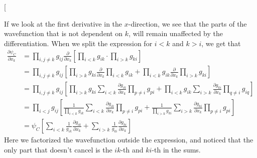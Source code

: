 \documentclass[twocolumns, a4paper,11pt,fleqn]{extarticle}
\newcommand{\equ}[1]{{\small\begin{align}#1\end{align}}}
\begin{document}
\twocolumn[{%
If we look at the first derivative in the $x$-direction, 
we see that the parts of the wavefunction that is not dependent on $k$, 
will remain unaffected by the 
differentiation.
When we split the expression for $i<k$ and $k>i$, we get that
\equ{
  \frac{\partial\psi_C}{\partial x_k}&=\prod_{i,j\neq k} g_{ij}
    \frac{\partial}{\partial x_k}
    \left[ \prod_{i<k} g_{ik} \cdot \prod_{i>k} g_{ki} \right]\nonumber\\
    &=\prod_{i,j\neq k} g_{ij}
      \left[\prod_{i>k} g_{ki}\frac{\partial}{\partial x_k}\prod_{i<k} g_{ik} 
      + \prod_{i<k} g_{ik} \frac{\partial}{\partial x_k}\prod_{i>k} g_{ki} \right]
      \nonumber\\
    &=\prod_{i,j\neq k} g_{ij}
      \left[\prod_{i>k} g_{ki} \sum_{i<k} \frac{\partial g_{ik}}{\partial x_k} \prod_{p\neq i} g_{pi}
      + \prod_{i<k} g_{ik} \sum_{i>k} \frac{\partial g_{ki}}{\partial x_k} \prod_{q\neq i} g_{iq} \right]
      \nonumber\\
    &=\prod_{i<j} g_{ij}
      \left[\frac{1}{\prod_{i<k} g_{ik}} \sum_{i<k} 
      \frac{\partial g_{ik}}{\partial x_k} \prod_{p\neq i} g_{pi}
      + \frac{1}{\prod_{i>k} g_{ki}} \sum_{i>k} 
      \frac{\partial g_{ki}}{\partial x_k} \prod_{p\neq i} g_{pi} \right]
      \nonumber\\
    &=\psi_C
      \left[\sum_{i<k} \frac{1}{g_{ik}} \frac{\partial g_{ik}}{\partial x_k}
      +\sum_{i>k} \frac{1}{g_{ki}} \frac{\partial g_{ki}}{\partial x_k} \right]
      \label{DpsiC}
}
Here we factorized the wavefunction outside the expression, 
and noticed that the only part that doesn't cancel is the $ik$-th and $ki$-th
in the sums.

}
\end{document}

